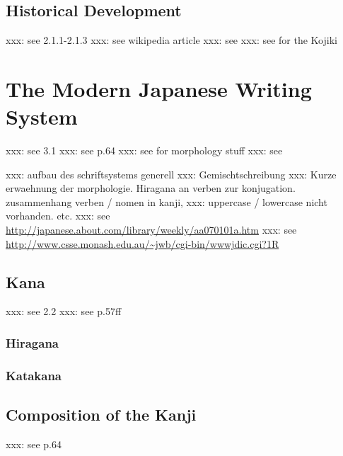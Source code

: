 \subsection{Historical Development}
\label{sec:historicaldevelopmentofjapanesescript}
xxx: see  2.1.1-2.1.3
xxx: see wikipedia article
xxx: see 
xxx: see  for the Kojiki




\section{The Modern Japanese Writing System}
\label{sec:modernjapanesewritingsystem}

xxx: see  3.1
xxx: see  p.64
xxx: see  for morphology stuff
xxx: see 

xxx: aufbau des schriftsystems generell
xxx: Gemischtschreibung
xxx: Kurze erwaehnung der morphologie. Hiragana an verben zur konjugation.
     zusammenhang verben / nomen in kanji, 
xxx: uppercase / lowercase nicht vorhanden. etc.
xxx: see \url{http://japanese.about.com/library/weekly/aa070101a.htm}
xxx: see \url{http://www.csse.monash.edu.au/~jwb/cgi-bin/wwwjdic.cgi?1R}

\subsection{Kana }
\label{sec:kana}

xxx: see  2.2
xxx: see  p.57ff

\subsubsection{Hiragana }
\label{sec:hiragana}

\subsubsection{Katakana }
\label{sec:katakana}

\subsection{Composition of the Kanji }
\label{sec:compositionofkanji}

xxx: see  p.64

